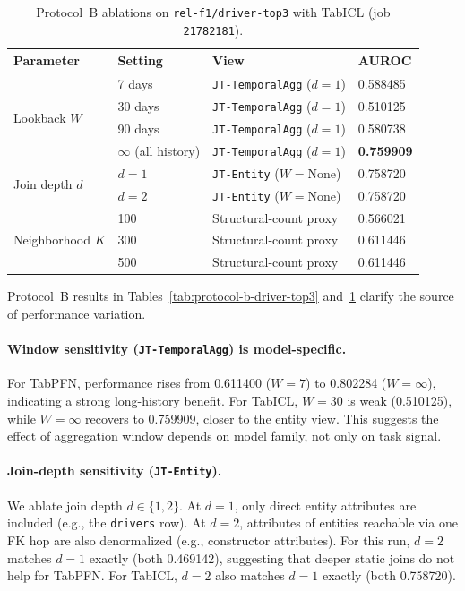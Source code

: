 \documentclass[11pt]{article}
\newcommand{\viewname}[1]{\texttt{#1}}
\begin{document}
\begin{table}[t]
\centering
\caption{Protocol~B ablations on \texttt{rel-f1/driver-top3} with TabICL
         (job \texttt{21782181}).}
\label{tab:protocol-b-driver-top3-tabicl}
\begin{tabular}{llll}
\toprule
Parameter & Setting & View & AUROC \\
\midrule
\multirow{4}{*}{Lookback $W$}
  & 7 days          & \viewname{JT-TemporalAgg} ($d=1$) & 0.588485 \\
  & 30 days         & \viewname{JT-TemporalAgg} ($d=1$) & 0.510125 \\
  & 90 days         & \viewname{JT-TemporalAgg} ($d=1$) & 0.580738 \\
  & $\infty$ (all history) & \viewname{JT-TemporalAgg} ($d=1$) & \textbf{0.759909} \\
\midrule
\multirow{2}{*}{Join depth $d$}
  & $d=1$ & \viewname{JT-Entity} ($W=\mathrm{None}$) & 0.758720 \\
  & $d=2$ & \viewname{JT-Entity} ($W=\mathrm{None}$) & 0.758720 \\
\midrule
\multirow{3}{*}{Neighborhood $K$}
  & 100 & Structural-count proxy & 0.566021 \\
  & 300 & Structural-count proxy & 0.611446 \\
  & 500 & Structural-count proxy & 0.611446 \\
\bottomrule
\end{tabular}
\end{table}

Protocol~B results in Tables~\ref{tab:protocol-b-driver-top3}
and~\ref{tab:protocol-b-driver-top3-tabicl} clarify the source of
performance variation.

\paragraph{Window sensitivity (\viewname{JT-TemporalAgg}) is model-specific.}
For TabPFN, performance rises from 0.611400 ($W=7$) to 0.802284
($W=\infty$), indicating a strong long-history benefit.
For TabICL, $W=30$ is weak (0.510125), while $W=\infty$ recovers to
0.759909, closer to the entity view. This suggests the effect of
aggregation window depends on model family, not only on task signal.

\paragraph{Join-depth sensitivity (\viewname{JT-Entity}).}
We ablate join depth $d \in \{1, 2\}$.
At $d=1$, only direct entity attributes are included (e.g., the
\texttt{drivers} row).
At $d=2$, attributes of entities reachable via one FK hop are also
denormalized (e.g., constructor attributes).
For this run, $d=2$ matches $d=1$ exactly (both 0.469142), suggesting
that deeper static joins do not help for TabPFN.
For TabICL, $d=2$ also matches $d=1$ exactly (both 0.758720).
\end{document}
